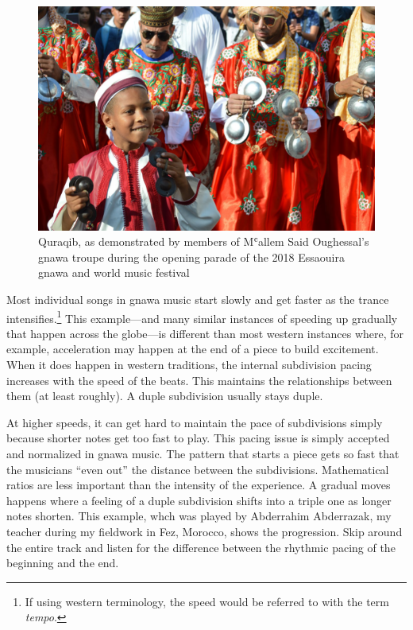 \documentclass[twoside]{article}
\begin{document}
\begin{figure}
\centering
\includegraphics{../../chapters/witulski-rhythm/images/gnawa.jpg}
\caption{Quraqib, as demonstrated by members of Mʿallem Said Oughessal's
gnawa troupe during the opening parade of the 2018 Essaouira gnawa and
world music festival}
\end{figure}

Most individual songs in gnawa music start slowly and get faster as the
trance intensifies.\footnote{If using western terminology, the speed
  would be referred to with the term \emph{tempo}.} This example---and
many similar instances of speeding up gradually that happen across the
globe---is different than most western instances where, for example,
acceleration may happen at the end of a piece to build excitement. When
it does happen in western traditions, the internal subdivision pacing
increases with the speed of the beats. This maintains the relationships
between them (at least roughly). A duple subdivision usually stays
duple.

At higher speeds, it can get hard to maintain the pace of subdivisions
simply because shorter notes get too fast to play. This pacing issue is
simply accepted and normalized in gnawa music. The pattern that starts a
piece gets so fast that the musicians ``even out'' the distance between
the subdivisions. Mathematical ratios are less important than the
intensity of the experience. A gradual moves happens where a feeling of
a duple subdivision shifts into a triple one as longer notes shorten.
This example, whch was played by Abderrahim Abderrazak, my teacher
during my fieldwork in Fez, Morocco, shows the progression. Skip around
the entire track and listen for the difference between the rhythmic
pacing of the beginning and the end.
\end{document}
